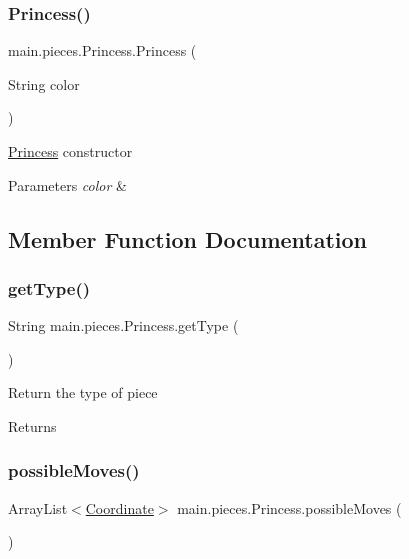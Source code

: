 \subsubsection{\texorpdfstring{Princess()}{Princess()}}
{\footnotesize\ttfamily main.\+pieces.\+Princess.\+Princess (\begin{DoxyParamCaption}\item[{String}]{color }\end{DoxyParamCaption})}

\hyperlink{classmain_1_1pieces_1_1_princess}{Princess} constructor 
\begin{DoxyParams}{Parameters}
{\em color} & \\
\hline
\end{DoxyParams}


\subsection{Member Function Documentation}
\hypertarget{classmain_1_1pieces_1_1_princess_a63a4459d73ae413757873769a0a66691}{}\label{classmain_1_1pieces_1_1_princess_a63a4459d73ae413757873769a0a66691} 
\subsubsection{\texorpdfstring{get\+Type()}{getType()}}
{\footnotesize\ttfamily String main.\+pieces.\+Princess.\+get\+Type (\begin{DoxyParamCaption}{ }\end{DoxyParamCaption})}

Return the type of piece \begin{DoxyReturn}{Returns}

\end{DoxyReturn}
\hypertarget{classmain_1_1pieces_1_1_princess_a77559cdb19a3fdd60237bddef0420b44}{}\label{classmain_1_1pieces_1_1_princess_a77559cdb19a3fdd60237bddef0420b44} 
\subsubsection{\texorpdfstring{possible\+Moves()}{possibleMoves()}}
{\footnotesize\ttfamily Array\+List$<$\hyperlink{classmain_1_1model_1_1_coordinate}{Coordinate}$>$ main.\+pieces.\+Princess.\+possible\+Moves (\begin{DoxyParamCaption}{ }\end{DoxyParamCaption})}

